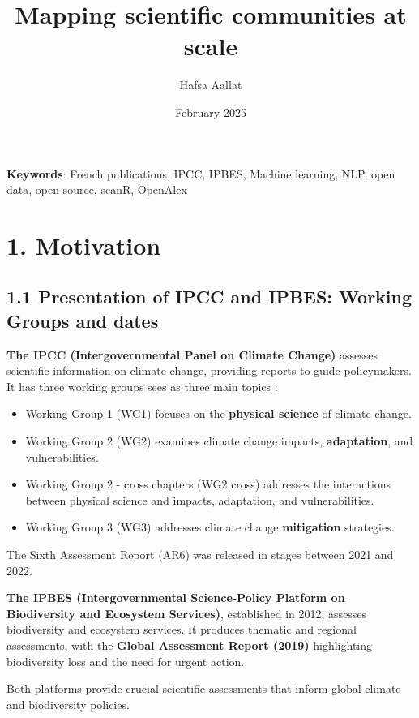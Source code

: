 \documentclass[
]{article}
\title{Mapping scientific communities at scale}
\author[%
  1%
  ]{%
  Hafsa Aallat%
}
\affil[1]{French Ministry of Higher Education and Research, Paris,
France}
\date{February 2025}
\providecommand{\tightlist}{%
  \setlength{\itemsep}{0pt}\setlength{\parskip}{0pt}}
\begin{document}
\maketitle

\textbf{Keywords}: French publications, IPCC, IPBES, Machine learning,
NLP, open data, open source, scanR, OpenAlex

\hypertarget{motivation}{%
\section{1. Motivation}\label{motivation}}

\hypertarget{presentation-of-ipcc-and-ipbes-working-groups-and-dates}{%
\subsection{1.1 Presentation of IPCC and IPBES: Working Groups and
dates}\label{presentation-of-ipcc-and-ipbes-working-groups-and-dates}}

\textbf{The IPCC (Intergovernmental Panel on Climate Change)} assesses
scientific information on climate change, providing reports to guide
policymakers. It has three working groups sees as three main topics :

\begin{itemize}
\tightlist
\item
  Working Group 1 (WG1) focuses on the \textbf{physical science} of
  climate change.
\item
  Working Group 2 (WG2) examines climate change impacts,
  \textbf{adaptation}, and vulnerabilities.
\item
  Working Group 2 - cross chapters (WG2 cross) addresses the
  interactions between physical science and impacts, adaptation, and
  vulnerabilities.
\item
  Working Group 3 (WG3) addresses climate change \textbf{mitigation}
  strategies.
\end{itemize}

The Sixth Assessment Report (AR6) was released in stages between 2021
and 2022.

\textbf{The IPBES (Intergovernmental Science-Policy Platform on
Biodiversity and Ecosystem Services)}, established in 2012, assesses
biodiversity and ecosystem services. It produces thematic and regional
assessments, with the \textbf{Global Assessment Report (2019)}
highlighting biodiversity loss and the need for urgent action.

Both platforms provide crucial scientific assessments that inform global
climate and biodiversity policies.
\end{document}
